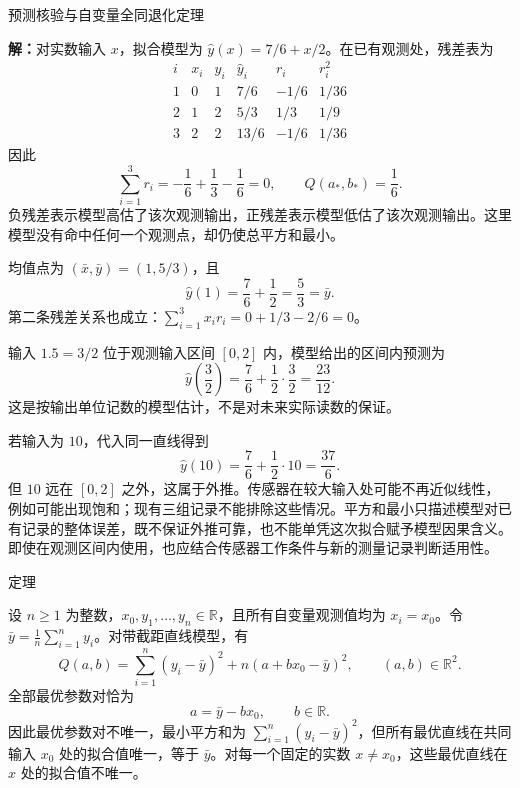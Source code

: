 \documentclass[aspectratio=169,10pt,fontset=fandol]{ctexbeamer}
\begin{document}
\begin{frame}[t,fragile]{预测核验与自变量全同退化定理}
\small
{\small
\par\noindent\textbf{解：}对实数输入 $x$，拟合模型为 $\hat{y}(x)=7/6+x/2$。在已有观测处，残差表为
\[
\begin{array}{c|r|r|r|r|r}
i&x_i&y_i&\hat{y}_i&r_i&r_i^2\\ \hline
1&0&1&7/6&-1/6&1/36\\
2&1&2&5/3&1/3&1/9\\
3&2&2&13/6&-1/6&1/36
\end{array}
\]
因此
\[
\sum_{i=1}^{3}r_i=-\frac16+\frac13-\frac16=0,
\qquad Q(a_*,b_*)=\frac16.
\]
负残差表示模型高估了该次观测输出，正残差表示模型低估了该次观测输出。这里模型没有命中任何一个观测点，却仍使总平方和最小。


}
{\small
均值点为 $(\bar{x},\bar{y})=(1,5/3)$，且
\[
\hat{y}(1)=\frac76+\frac12=\frac53=\bar{y}.
\]
第二条残差关系也成立：$\sum_{i=1}^{3}x_i r_i=0+1/3-2/6=0$。


}
{\small
输入 $1.5=3/2$ 位于观测输入区间 $[0,2]$ 内，模型给出的区间内预测为
\[
\hat{y}\left(\frac32\right)=\frac76+\frac12\cdot\frac32
=\frac{23}{12}.
\]
这是按输出单位记数的模型估计，不是对未来实际读数的保证。


}
{\small
若输入为 $10$，代入同一直线得到
\[
\hat{y}(10)=\frac76+\frac12\cdot10=\frac{37}{6}.
\]
但 $10$ 远在 $[0,2]$ 之外，这属于外推。传感器在较大输入处可能不再近似线性，例如可能出现饱和；现有三组记录不能排除这些情况。平方和最小只描述模型对已有记录的整体误差，既不保证外推可靠，也不能单凭这次拟合赋予模型因果含义。即使在观测区间内使用，也应结合传感器工作条件与新的测量记录判断适用性。\par

}
\begin{block}{定理}
{\small
设 $n\geq1$ 为整数，$x_0,y_1,\ldots,y_n\in\mathbb{R}$，且所有自变量观测值均为 $x_i=x_0$。令 $\bar{y}=\frac1n\sum_{i=1}^{n}y_i$。对带截距直线模型，有
\[
Q(a,b)=\sum_{i=1}^{n}(y_i-\bar{y})^2+n(a+bx_0-\bar{y})^2,
\qquad (a,b)\in\mathbb{R}^2.
\]
全部最优参数对恰为
\[
a=\bar{y}-bx_0,\qquad b\in\mathbb{R}.
\]
因此最优参数对不唯一，最小平方和为 $\sum_{i=1}^{n}(y_i-\bar{y})^2$，但所有最优直线在共同输入 $x_0$ 处的拟合值唯一，等于 $\bar{y}$。对每一个固定的实数 $x\ne x_0$，这些最优直线在 $x$ 处的拟合值不唯一。

}
\end{block}
\end{frame}
\end{document}
